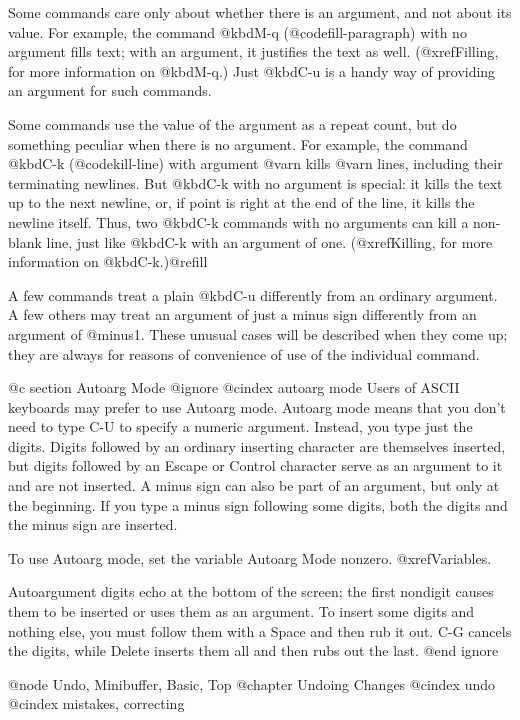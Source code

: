 {{  Some commands care only about whether there is an argument, and not about
its value.  For example, the command @kbd{M-q} (@code{fill-paragraph}) with
no argument fills text; with an argument, it justifies the text as well.
(@xref{Filling}, for more information on @kbd{M-q}.)  Just @kbd{C-u} is a
handy way of providing an argument for such commands.

  Some commands use the value of the argument as a repeat count, but do
something peculiar when there is no argument.  For example, the command
@kbd{C-k} (@code{kill-line}) with argument @var{n} kills @var{n} lines,
including their terminating newlines.  But @kbd{C-k} with no argument is
special: it kills the text up to the next newline, or, if point is right at
the end of the line, it kills the newline itself.  Thus, two @kbd{C-k}
commands with no arguments can kill a non-blank line, just like @kbd{C-k}
with an argument of one.  (@xref{Killing}, for more information on
@kbd{C-k}.)@refill

  A few commands treat a plain @kbd{C-u} differently from an ordinary
argument.  A few others may treat an argument of just a minus sign
differently from an argument of @minus{}1.  These unusual cases will be
described when they come up; they are always for reasons of convenience
of use of the individual command.

@c section Autoarg Mode
@ignore
@cindex autoarg mode
  Users of ASCII keyboards may prefer to use Autoarg mode.  Autoarg mode
means that you don't need to type C-U to specify a numeric argument.
Instead, you type just the digits.  Digits followed by an ordinary
inserting character are themselves inserted, but digits followed by an
Escape or Control character serve as an argument to it and are not
inserted.  A minus sign can also be part of an argument, but only at the
beginning.  If you type a minus sign following some digits, both the digits
and the minus sign are inserted.

  To use Autoarg mode, set the variable Autoarg Mode nonzero.
@xref{Variables}.

  Autoargument digits echo at the bottom of the screen; the first nondigit
causes them to be inserted or uses them as an argument.  To insert some
digits and nothing else, you must follow them with a Space and then rub it
out.  C-G cancels the digits, while Delete inserts them all and then rubs
out the last.
@end ignore

@node Undo, Minibuffer, Basic, Top
@chapter Undoing Changes
@cindex undo
@cindex mistakes, correcting

}}
